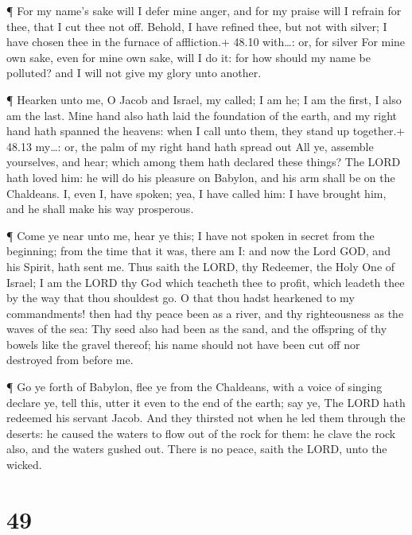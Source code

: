 ¶ For my name's sake will I defer mine anger, and for my
praise will I refrain for thee, that I cut thee not off. 
Behold, I have refined thee, but not with silver; I have chosen thee in
the furnace of affliction.+ 48.10 with\ldots: or, for silver
 For mine own sake, even for mine own sake, will I do it:
for how should my name be polluted? and I will not give my glory unto
another.

 ¶ Hearken unto me, O Jacob and Israel, my called; I am he;
I am the first, I also am the last.  Mine hand also hath
laid the foundation of the earth, and my right hand hath spanned the
heavens: when I call unto them, they stand up together.+ 48.13 my\ldots:
or, the palm of my right hand hath spread out  All ye,
assemble yourselves, and hear; which among them hath declared these
things? The LORD hath loved him: he will do his pleasure on Babylon, and
his arm shall be on the Chaldeans.  I, even I, have spoken;
yea, I have called him: I have brought him, and he shall make his way
prosperous.

 ¶ Come ye near unto me, hear ye this; I have not spoken in
secret from the beginning; from the time that it was, there am I: and
now the Lord GOD, and his Spirit, hath sent me.  Thus saith
the LORD, thy Redeemer, the Holy One of Israel; I am the LORD thy God
which teacheth thee to profit, which leadeth thee by the way that thou
shouldest go.  O that thou hadst hearkened to my
commandments! then had thy peace been as a river, and thy righteousness
as the waves of the sea:  Thy seed also had been as the
sand, and the offspring of thy bowels like the gravel thereof; his name
should not have been cut off nor destroyed from before me.

 ¶ Go ye forth of Babylon, flee ye from the Chaldeans, with
a voice of singing declare ye, tell this, utter it even to the end of
the earth; say ye, The LORD hath redeemed his servant Jacob.
 And they thirsted not when he led them through the
deserts: he caused the waters to flow out of the rock for them: he clave
the rock also, and the waters gushed out.  There is no
peace, saith the LORD, unto the wicked.

\hypertarget{section-48}{%
\section{49}\label{section-48}}


